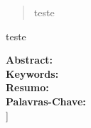 \documentclass[
	article,			%
	11pt,				%
	oneside,			%
	a4paper,			%
	twocolumn,
	english,			%
	brazil,				%
	sumario=tradicional
	]{abntex2}
\begin{document}
	\begin{abstract}
		teste
	\end{abstract}


	\begin{resumo}
		teste
	\end{resumo}

	\textbf{Abstract:}\\
	\textbf{Keywords:}\\
	\textbf{Resumo:}\\
	\textbf{Palavras-Chave:}\\
]


 
 



 



\end{document}
